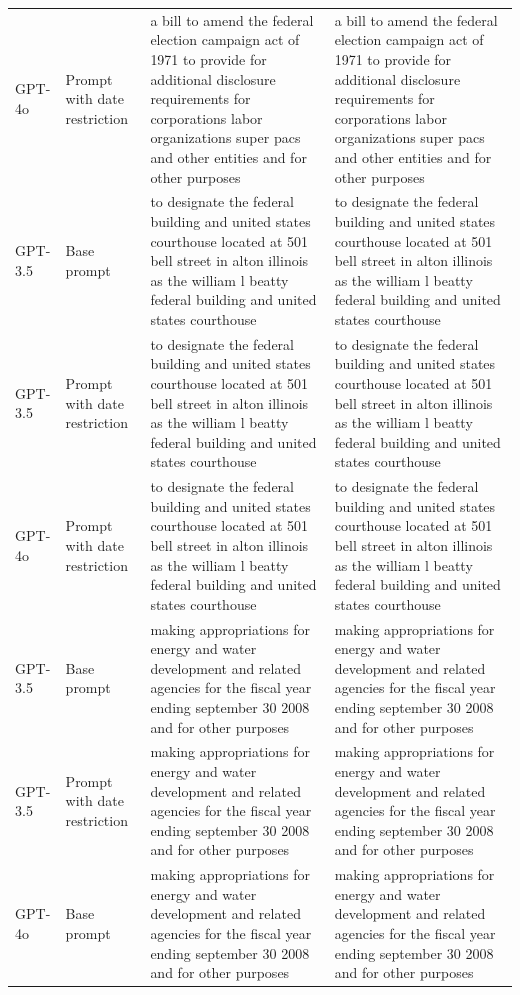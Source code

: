 \begin{longtable}{>{\raggedright\arraybackslash}p{1.4cm}>{\raggedright\arraybackslash}p{1.4cm}>{\raggedright\arraybackslash}p{5.5cm}>{\raggedright\arraybackslash}p{5.5cm}}
GPT-4o & Prompt with date restriction & a bill to amend the federal election campaign act of 1971 to provide for additional disclosure requirements for corporations labor organizations super pacs and other entities and for other purposes & a bill to amend the federal election campaign act of 1971 to provide for additional disclosure requirements for corporations labor organizations super pacs and other entities and for other purposes\\
GPT-3.5 & Base prompt & to designate the federal building and united states courthouse located at 501 bell street in alton illinois as the william l beatty federal building and united states courthouse & to designate the federal building and united states courthouse located at 501 bell street in alton illinois as the william l beatty federal building and united states courthouse\\
GPT-3.5 & Prompt with date restriction & to designate the federal building and united states courthouse located at 501 bell street in alton illinois as the william l beatty federal building and united states courthouse & to designate the federal building and united states courthouse located at 501 bell street in alton illinois as the william l beatty federal building and united states courthouse\\
GPT-4o & Prompt with date restriction & to designate the federal building and united states courthouse located at 501 bell street in alton illinois as the william l beatty federal building and united states courthouse & to designate the federal building and united states courthouse located at 501 bell street in alton illinois as the william l beatty federal building and united states courthouse\\
GPT-3.5 & Base prompt & making appropriations for energy and water development and related agencies for the fiscal year ending september 30 2008 and for other purposes & making appropriations for energy and water development and related agencies for the fiscal year ending september 30 2008 and for other purposes\\
GPT-3.5 & Prompt with date restriction & making appropriations for energy and water development and related agencies for the fiscal year ending september 30 2008 and for other purposes & making appropriations for energy and water development and related agencies for the fiscal year ending september 30 2008 and for other purposes\\
GPT-4o & Base prompt & making appropriations for energy and water development and related agencies for the fiscal year ending september 30 2008 and for other purposes & making appropriations for energy and water development and related agencies for the fiscal year ending september 30 2008 and for other purposes\\

\end{longtable}
